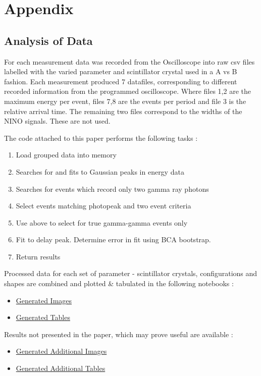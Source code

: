 \section*{Appendix}
\subsection{Analysis of Data}
For each measurement data was recorded from the Oscilloscope into raw csv files labelled with the varied parameter and scintillator crystal used in a A vs B fashion. Each measurement produced 7 datafiles, corresponding to different recorded information from the programmed oscilloscope. Where files 1,2 are the maximum energy per event, files 7,8 are the events per period and file 3 is the relative arrival time. The remaining two files correspond to the widths of the NINO signals. These are not used.

The code attached to this paper performs the following tasks : 

\begin{enumerate}
\item Load grouped data into memory
\item Searches for and fits to Gaussian peaks in energy data
\item Searches for events which record only two gamma ray photons
\item Select events matching photopeak and two event criteria
\item Use above to select for true gamma-gamma events only
\item Fit to delay peak. Determine error in fit using BCA bootstrap.
\item Return results
\end{enumerate}

Processed data for each set of parameter - scintillator crystals, configurations and shapes are combined and plotted \& tabulated in the following notebooks :
\begin{itemize}
\item \href{http://nbviewer.ipython.org/github/marksbrown/doipaper/blob/master/notebooks/Generate%20Images.ipynb}{Generated Images}
\item \href{http://nbviewer.ipython.org/github/marksbrown/doipaper/blob/master/notebooks/Generate%20Tables.ipynb}{Generated Tables}
\end{itemize}
Results not presented in the paper, which may prove useful are available :
\begin{itemize}
\item \href{http://nbviewer.ipython.org/github/marksbrown/doipaper/blob/master/notebooks/Generate%20Additional%20Images.ipynb}{Generated Additional Images}
\item \href{http://nbviewer.ipython.org/github/marksbrown/doipaper/blob/master/notebooks/Generate%20Additional%20Tables.ipynb}{Generated Additional Tables}
\end{itemize}
